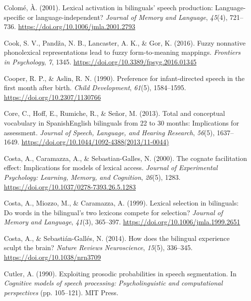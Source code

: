 \documentclass[
  12pt,
  b5paperpaper,
  twoside]{scrreprt}
\newlength{\cslhangindent}
\newlength{\cslentryspacingunit} %
\newenvironment{CSLReferences}[2] %
 {%
  \setlength{\parindent}{0pt}
  \ifodd #1
  \let\oldpar\par
  \def\par{\hangindent=\cslhangindent\oldpar}
  \fi
  \setlength{\parskip}{#2\cslentryspacingunit}
 }%
 {}
\begin{document}
\begin{CSLReferences}{1}{0}
\leavevmode{}%
Colomé, À. (2001). Lexical activation in bilinguals' speech production:
Language-specific or language-independent? \emph{Journal of Memory and
Language}, \emph{45}(4), 721--736.
\url{https://doi.org/10.1006/jmla.2001.2793}

\leavevmode{}%
Cook, S. V., Pandža, N. B., Lancaster, A. K., \& Gor, K. (2016). Fuzzy
nonnative phonolexical representations lead to fuzzy form-to-meaning
mappings. \emph{Frontiers in Psychology}, \emph{7}, 1345.
\url{https://doi.org/10.3389/fpsyg.2016.01345}

\leavevmode{}%
Cooper, R. P., \& Aslin, R. N. (1990). Preference for infant-directed
speech in the first month after birth. \emph{Child Development},
\emph{61}(5), 1584--1595. \url{https://doi.org/10.2307/1130766}

\leavevmode{}%
Core, C., Hoff, E., Rumiche, R., \& Señor, M. (2013). Total and
conceptual vocabulary in {Spanish}{\textendash}{English} bilinguals from
22 to 30 months: Implications for assessment. \emph{Journal of Speech,
Language, and Hearing Research}, \emph{56}(5), 1637--1649.
\url{https://doi.org/10.1044/1092-4388(2013/11-0044)}

\leavevmode{}%
Costa, A., Caramazza, A., \& Sebastian-Galles, N. (2000). The cognate
facilitation effect: Implications for models of lexical access.
\emph{Journal of Experimental Psychology: Learning, Memory, and
Cognition}, \emph{26}(5), 1283.
\url{https://doi.org/10.1037/0278-7393.26.5.1283}

\leavevmode{}%
Costa, A., Miozzo, M., \& Caramazza, A. (1999). Lexical selection in
bilinguals: Do words in the bilingual's two lexicons compete for
selection? \emph{Journal of Memory and Language}, \emph{41}(3),
365--397. \url{https://doi.org/10.1006/jmla.1999.2651}

\leavevmode{}%
Costa, A., \& Sebastián-Gallés, N. (2014). How does the bilingual
experience sculpt the brain? \emph{Nature Reviews Neuroscience},
\emph{15}(5), 336--345. \url{https://doi.org/10.1038/nrn3709}

\leavevmode{}%
Cutler, A. (1990). Exploiting prosodic probabilities in speech
segmentation. In \emph{Cognitive models of speech processing:
{Psycholinguistic} and computational perspectives} (pp. 105--121). {MIT
Press}.


\end{CSLReferences}
\end{document}
